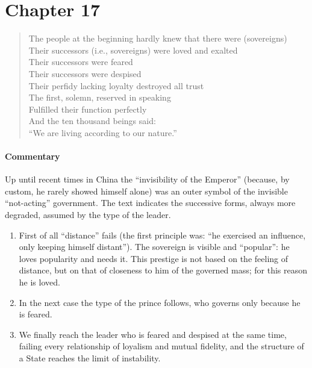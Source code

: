 \section{Chapter 17}

\begin{verse}
The people at the beginning hardly knew that there were (sovereigns)\\
Their successors (i.e., sovereigns) were loved and exalted\\
Their successors were feared\\
Their successors were despised\\
Their perfidy lacking loyalty destroyed all trust\\
The first, solemn, reserved in speaking\\
Fulfilled their function perfectly\\
And the ten thousand beings said:\\
``We are living according to our nature.''
\end{verse}

\paragraph{Commentary}


Up until recent times in China the ``invisibility of the Emperor'' (because, by custom, he rarely showed himself alone) was an outer symbol of the invisible ``not-acting'' government. The text indicates the successive forms, always more degraded, assumed by the type of the leader.

\begin{enumerate}


\item First of all ``distance'' fails (the first principle was: ``he exercised an influence, only keeping himself distant''). The sovereign is visible and ``popular'': he loves popularity and needs it. This prestige is not based on the feeling of distance, but on that of closeness to him of the governed mass; for this reason he is loved.

\item In the next case the type of the prince follows, who governs only because he is feared.

\item We finally reach the leader who is feared and despised at the same time, failing every relationship of loyalism and mutual fidelity, and the structure of a State reaches the limit of instability.
\end{enumerate}


